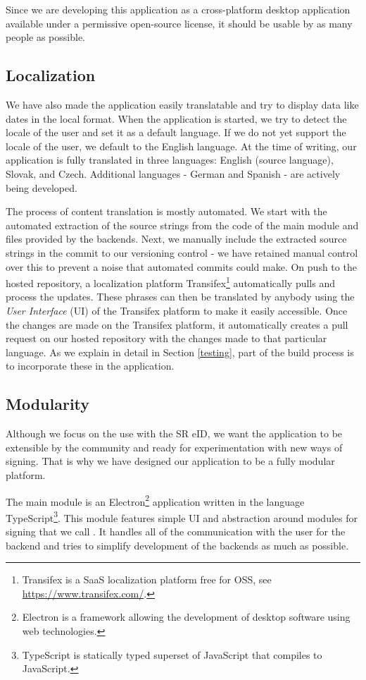 \documentclass[thesismargins, english, thesislinespacing, onelinechapterstyle, upjsfrontpage]{rnthesis}
\begin{document}
Since we are developing this application as a cross-platform desktop application available under a permissive open-source license, it should be usable by as many people as possible.

\subsection{Localization}

We have also made the application easily translatable and try to display data like dates in the local format.
When the application is started, we try to detect the locale of the user and set it as a default language.
If we do not yet support the locale of the user, we default to the English language.
At the time of writing, our application is fully translated in three languages: English (source language), Slovak, and Czech.
Additional languages - German and Spanish - are actively being developed.

The process of content translation is mostly automated.
We start with the automated extraction of the source strings from the code of the main module and files provided by the backends.
Next, we manually include the extracted source strings in the commit to our versioning control - we have retained manual control over this to prevent a noise that automated commits could make.
On push to the hosted repository, a localization platform Transifex\footnote{Transifex is a SaaS localization platform free for OSS, see \url{https://www.transifex.com/}.} automatically pulls and process the updates.
These phrases can then be translated by anybody using the \textit{User Interface} (UI) of the Transifex platform to make it easily accessible.
Once the changes are made on the Transifex platform, it automatically creates a pull request on our hosted repository with the changes made to that particular language.
As we explain in detail in Section \ref{testing}, part of the build process is to incorporate these in the application.

\subsection{Modularity}

Although we focus on the use with the SR eID, we want the application to be extensible by the community and ready for experimentation with new ways of signing.
That is why we have designed our application to be a fully modular platform.

The main module is an Electron\footnote{Electron is a framework allowing the development of desktop software using web technologies.} application written in the language TypeScript\footnote{TypeScript is statically typed superset of JavaScript that compiles to JavaScript.}.
This module features simple UI and abstraction around modules for signing that we call .
It handles all of the communication with the user for the backend and tries to simplify development of the backends as much as possible.
\end{document}
